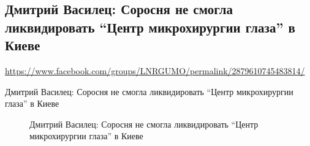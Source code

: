  
 
  
\subsection{Дмитрий Василец: Соросня не смогла ликвидировать “Центр микрохирургии глаза” в Киеве}
\url{https://www.facebook.com/groups/LNRGUMO/permalink/2879610745483814/}

Дмитрий Василец: Соросня не смогла ликвидировать “Центр микрохирургии глаза” в Киеве

\begin{figure}[ht]
 \centering
 \caption{Дмитрий Василец: Соросня не смогла ликвидировать “Центр микрохирургии глаза” в Киеве}
 \label{fig:}
\end{figure}
  
